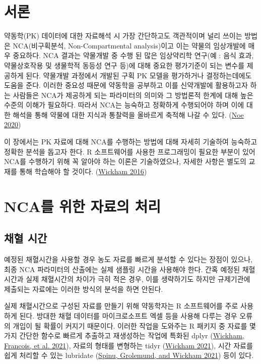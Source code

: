 \documentclass[
  11pt,
  krantz2, a4paper, twoside]{krantz}
\theoremstyle{definition}
\theoremstyle{definition}
\theoremstyle{definition}
\theoremstyle{definition}
\theoremstyle{remark}
\begin{document}
\hypertarget{uxc11cuxb860-2}{%
\section{서론}\label{uxc11cuxb860-2}}

약동학(PK) 데이터에 대한 자료해석 시 가장 간단하고도 객관적이며 널리 쓰이는 방법은 NCA(비구획분석, Non-Compartmental analysis)이고 이는 약물의 임상개발에 매우 중요하다.
NCA 결과는 약물개발 중 수행 된 많은 임상약리학 연구(예 : 음식 효과, 약물상호작용 및 생물학적 동등성 연구 등)에 대해 중요한 평가기준이 되는 변수를 제공하게 된다.
약물개발 과정에서 개발된 구획 PK 모델을 평가하거나 결정하는데에도 도움을 준다.
이러한 중요성 때문에 약동학을 공부하고 이를 신약개발에 활용하고자 하는 사람들은 NCA가 제공하게 되는 파라미터의 의미와 그 방법론적 한계에 대해 높은 수준의 이해가 필요하다. 
따라서 NCA는 능숙하고 정확하게 수행되어야 하며 이에 대한 해석을 통해 약물에 대한 지식과 통찰력을 올바르게 축적해 나갈 수 있다. (\protect\hyperlink{ref-noe2020parameter}{Noe 2020})

이 장에서는 PK 자료에 대해 NCA를 수행하는 방법에 대해 자세히 기술하여 능숙하고 정확한 분석을 돕고자 한다. R 소프트웨어를 사용한 프로그래밍이 필요한 부분이 있어 NCA를 수행하기 위해 꼭 알아야 하는 이론은 기술하였으나, 자세한 사항은 별도의 교재를 통해 학습해야 할 것이다. (\protect\hyperlink{ref-ggplot22016}{Wickham 2016})

\hypertarget{data-prep}{%
\section{NCA를 위한 자료의 처리}\label{data-prep}}

\hypertarget{uxcc44uxd608-uxc2dcuxac04}{%
\subsection{채혈 시간}\label{uxcc44uxd608-uxc2dcuxac04}}

예정된 채혈시간을 사용할 경우 농도 자료를 빠르게 분석할 수 있다는 장점이 있으나, 최종 NCA 파라미터의 산출에는 실제 샘플링 시간을 사용해야 한다. 간혹 예정된 채혈시간과 실제 채혈시간의 차이가 극히 적은 경우, 이를 생략하기도 하지만 규제기관에 제출되는 자료에는 이러한 방식의 분석을 하면 안된다.

실제 채혈시간으로 구성된 자료를 만들기 위해 약동학자는 R 소프트웨어를 주로 사용하게 된다. 방대한 채혈 데이터를 마이크로소프트 엑셀 등을 사용해 다루는 경우 오류의 개입이 될 확률이 커지기 때문이다. 이러한 작업을 도와주는 R 패키지 중 자료를 몇가지 간단한 함수로 빠르게 추출하고 재생성하는 작업에 특화된 dplyr (\protect\hyperlink{ref-R-dplyr}{Wickham, Francois, et al. 2021}), 자료의 형태를 변형하는 tidyr (\protect\hyperlink{ref-R-tidyr}{Wickham 2021}), 시간 자료를 쉽게 처리할 수 있는 lubridate (\protect\hyperlink{ref-R-lubridate}{Spinu, Grolemund, and Wickham 2021}) 등이 있다. 
\end{document}
